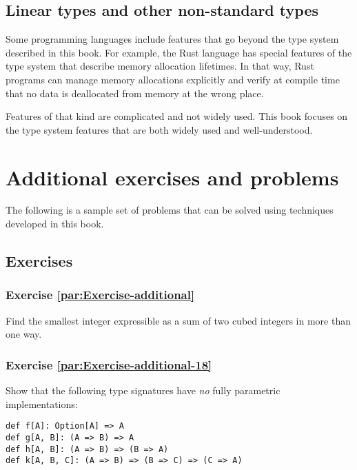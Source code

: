 \subsection{Linear types and other non-standard types}

Some programming languages include features that go beyond the type
system described in this book. For example, the Rust language has
special features of the type system that describe memory allocation
lifetimes. In that way, Rust programs can manage memory allocations
explicitly and verify at compile time that no data is deallocated
from memory at the wrong place.

Features of that kind are complicated and not widely used. This book
focuses on the type system features that are both widely used and
well-understood.

\section{Additional exercises and problems\label{chap:Exercises-in-AFTT}}

The following is a sample set of problems that can be solved using
techniques developed in this book.

\subsection{Exercises}

\subsubsection{Exercise \label{par:Exercise-additional}\ref{par:Exercise-additional}}

Find the smallest integer expressible as a sum of two cubed integers
in more than one way.

\subsubsection{Exercise \label{par:Exercise-additional-18}\ref{par:Exercise-additional-18}}

Show that the following type signatures have \emph{no} fully parametric
implementations:

\begin{lstlisting}
def f[A]: Option[A] => A
def g[A, B]: (A => B) => A
def h[A, B]: (A => B) => (B => A)
def k[A, B, C]: (A => B) => (B => C) => (C => A)
\end{lstlisting}

